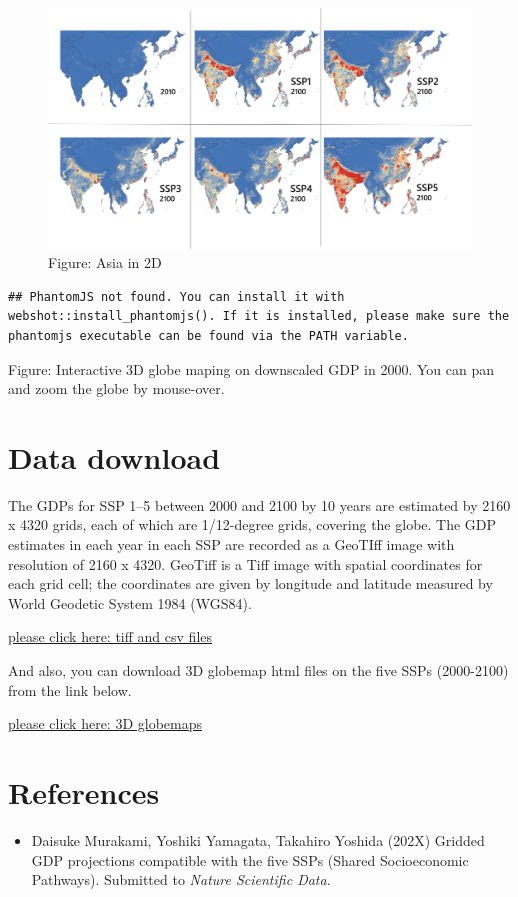 \documentclass[]{book}
\providecommand{\tightlist}{%
  \setlength{\itemsep}{0pt}\setlength{\parskip}{0pt}}
\begin{document}
\begin{figure}
\centering
\includegraphics{Asia.png}
\caption{Figure: Asia in 2D}
\end{figure}

\begin{verbatim}
## PhantomJS not found. You can install it with webshot::install_phantomjs(). If it is installed, please make sure the phantomjs executable can be found via the PATH variable.
\end{verbatim}

\hypertarget{Q2II5W6ecE}{}

Figure: Interactive 3D globe maping on downscaled GDP in 2000. You can pan and zoom the globe by mouse-over.

\hypertarget{data-download}{%
\section{Data download}\label{data-download}}

The GDPs for SSP 1--5 between 2000 and 2100 by 10 years are estimated by 2160 x 4320 grids, each of which are 1/12-degree grids, covering the globe. The GDP estimates in each year in each SSP are recorded as a GeoTIff image with resolution of 2160 x 4320. GeoTiff is a Tiff image with spatial coordinates for each grid cell; the coordinates are given by longitude and latitude measured by World Geodetic System 1984 (WGS84).

\href{https://www.dropbox.com/sh/d598disl4v97tnn/AAAnZmMCY61PcLLEdNsXgW4Ta?dl=0}{please click here: tiff and csv files}

And also, you can download 3D globemap html files on the five SSPs (2000-2100) from the link below.

\href{https://www.dropbox.com/sh/qw8h02vd33hcl1p/AADUciV3ldCJMriHnVoU6qlpa?dl=0}{please click here: 3D globemaps}

\hypertarget{references}{%
\section{References}\label{references}}

\begin{itemize}
\tightlist
\item
  Daisuke Murakami, Yoshiki Yamagata, Takahiro Yoshida (202X) Gridded GDP projections compatible with the five SSPs (Shared Socioeconomic Pathways). Submitted to \emph{Nature Scientific Data}.
\end{itemize}


\end{document}
